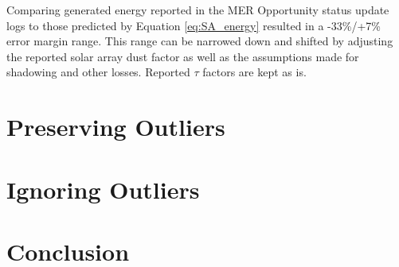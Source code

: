 Comparing generated energy reported in the MER Opportunity status update logs to those predicted by Equation \ref{eq:SA_energy} resulted in a -33\%/+7\% error margin range. This range can be narrowed down and shifted by adjusting the reported solar array dust factor as well as the assumptions made for shadowing and other losses. Reported $\tau$ factors are kept as is.

\section{Preserving Outliers}
\label{sec:Appendix:NarrowedEnergyPredictionErrorMarginRange:PreservingOutliers}

\clearpage

\section{Ignoring Outliers}
\label{sec:Appendix:NarrowedEnergyPredictionErrorMarginRange:IgnoringOutliers}

\clearpage

\section{Conclusion}
\label{sec:Appendix:NarrowedEnergyPredictionErrorMarginRange:Conclusion}

\clearpage
